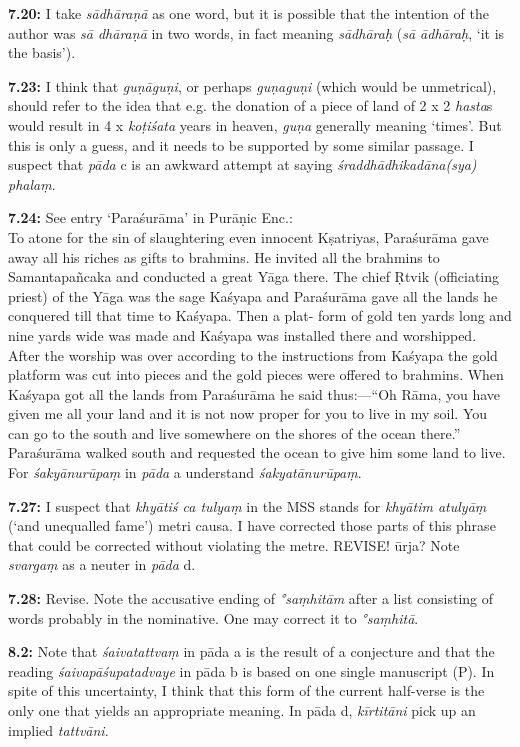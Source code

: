 \documentclass{article}
\newcommand{\vsnum}[1]{\textbf{#1}}
\newcommand{\skt}[1]{\textit{#1}}
\newcommand{\msP}{P}
\begin{document}
\vsnum{7.20: }I take \skt{sādhāraṇā} as one word, but it is possible that the intention of the author was \skt{sā dhāraṇā} in two words, in fact meaning \skt{sādhāraḥ} (\skt{sā ādhāraḥ}, `it is the basis').

\vsnum{7.23: }I think that \skt{guṇāguṇi}, or perhaps \skt{guṇaguṇi} (which would be unmetrical), should refer to the idea that e.g. the donation of a piece of land of 2 x 2 \skt{hasta}s would result in 4 x \skt{koṭiśata} years in heaven, \skt{guṇa} generally meaning `times'. But this is only a guess, and it needs to be supported by some similar passage. I suspect that \skt{pāda} c is an awkward attempt at saying \skt{śraddhādhikadāna(sya) phalaṃ}.

\vsnum{7.24: }See entry `Paraśurāma' in Purāṇic Enc.: \\ To atone for the sin of slaughtering even innocent Kṣatriyas, Paraśurāma gave away all his riches as gifts to brahmins. He invited all the brahmins to Samantapañcaka and conducted a great Yāga there. The chief Ṛtvik (officiating priest) of the Yāga was the sage Kaśyapa and Paraśurāma gave all the lands he conquered till that time to Kaśyapa. Then a plat- form of gold ten yards long and nine yards wide was made and Kaśyapa was installed there and worshipped. After the worship was over according to the instructions from Kaśyapa the gold platform was cut into pieces and the gold pieces were offered to brahmins. When Kaśyapa got all the lands from Paraśurāma he said thus:—“Oh Rāma, you have given me all your land and it is not now proper for you to live in my soil. You can go to the south and live somewhere on the shores of the ocean there.” Paraśurāma walked south and requested the ocean to give him some land to live. For \skt{śakyānurūpaṃ} in \skt{pāda} a understand \skt{śakyatānurūpaṃ}.

\vsnum{7.27: }I suspect that \skt{khyātiś ca tulyaṃ} in the MSS stands for \skt{khyātim atulyāṃ} (`and unequalled fame') metri causa. I have corrected those parts of this phrase that could be corrected without violating the metre. REVISE! ūrja? Note \skt{svargaṃ} as a neuter in \skt{pāda} d.

\vsnum{7.28: }Revise. 
Note the accusative ending of \skt{°saṃhitām} after a list consisting of words probably in the nominative. One may correct it to \skt{°saṃhitā}.

\vsnum{8.2: }Note that \skt{śaivatattvaṃ} in pāda a is the result of a conjecture and that the reading \skt{śaivapāśupatadvaye} in pāda b is based on one single manuscript (\msP). In spite of this uncertainty, I think that this form of the current half-verse is the only one that yields an appropriate meaning. In pāda d, \skt{kīrtitāni} pick up an implied \skt{tattvāni}.
\end{document}
